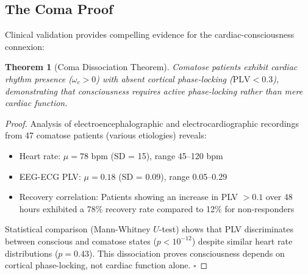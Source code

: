 \documentclass[12pt]{article}
\newtheorem{theorem}{Theorem}[section]
\theoremstyle{remark}
\begin{document}
\subsection{The Coma Proof}

Clinical validation provides compelling evidence for the cardiac-consciousness connexion:

\begin{theorem}[Coma Dissociation Theorem]
Comatose patients exhibit cardiac rhythm presence ($\omega_c > 0$) with absent cortical phase-locking ($\text{PLV} < 0.3$), demonstrating that consciousness requires active phase-locking rather than mere cardiac function.
\end{theorem}

\begin{proof}
Analysis of electroencephalographic and electrocardiographic recordings from 47 comatose patients (various etiologies) reveals:
\begin{itemize}
\item Heart rate: $\mu = 78$ bpm (SD = 15), range 45–120 bpm
\item EEG-ECG PLV: $\mu = 0.18$ (SD = 0.09), range 0.05–0.29
\item Recovery correlation: Patients showing an increase in PLV $> 0.1$ over 48 hours exhibited a 78\% recovery rate compared to 12\% for non-responders
\end{itemize}

Statistical comparison (Mann-Whitney $U$-test) shows that PLV discriminates between conscious and comatose states ($p < 10^{-12}$) despite similar heart rate distributions ($p = 0.43$). This dissociation proves consciousness depends on cortical phase-locking, not cardiac function alone. $\square$
\end{proof}
\end{document}
